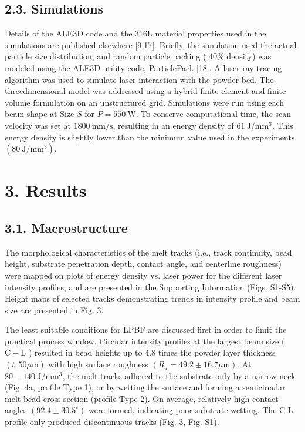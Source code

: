 \documentclass[10pt]{article}
\begin{document}
\subsection*{2.3. Simulations}
Details of the ALE3D code and the 316L material properties used in the simulations are published elsewhere [9,17]. Briefly, the simulation used the actual particle size distribution, and random particle packing ( $40 \%$ density) was modeled using the ALE3D utility code, ParticlePack [18]. A laser ray tracing algorithm was used to simulate laser interaction with the powder bed. The threedimensional model was addressed using a hybrid finite element and finite volume formulation on an unstructured grid. Simulations were run using each beam shape at Size $S$ for $P=550 \mathrm{~W}$. To conserve computational time, the scan velocity was set at $1800 \mathrm{~mm} / \mathrm{s}$, resulting in an energy density of $61 \mathrm{~J} / \mathrm{mm}^{3}$. This energy density is slightly lower than the minimum value used in the experiments $\left(80 \mathrm{~J} / \mathrm{mm}^{3}\right)$.

\section*{3. Results}
\subsection*{3.1. Macrostructure}
The morphological characteristics of the melt tracks (i.e., track continuity, bead height, substrate penetration depth, contact angle, and centerline roughness) were mapped on plots of energy density vs. laser power for the different laser intensity profiles, and are presented in the Supporting Information (Figs. S1-S5). Height maps of selected tracks demonstrating trends in intensity profile and beam size are presented in Fig. 3.

The least suitable conditions for LPBF are discussed first in order to limit the practical process window. Circular intensity profiles at the largest beam size ( $\mathrm{C}-\mathrm{L}$ ) resulted in bead heights up to 4.8 times the powder layer thickness $(t, 50 \mu \mathrm{m})$ with high surface roughness $\left(R_{a}=49.2 \pm 16.7 \mu \mathrm{m}\right)$. At $80-140 \mathrm{~J} / \mathrm{mm}^{3}$, the melt tracks adhered to the substrate only by a narrow neck (Fig. 4a, profile Type 1), or by wetting the surface and forming a semicircular melt bead cross-section (profile Type 2). On average, relatively high contact angles $\left(92.4 \pm 30.5^{\circ}\right)$ were formed, indicating poor substrate wetting. The C-L profile only produced discontinuous tracks (Fig. 3, Fig. S1).
\end{document}
